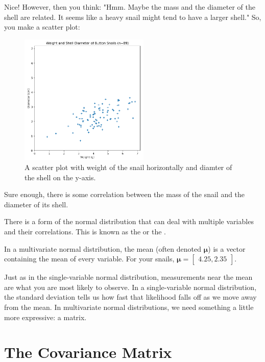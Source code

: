 Nice! However, then you think: "Hmm. Maybe the mass and the diameter of the shell are related. It seems like a heavy snail might tend to have a larger shell."  So, you make a scatter plot:

\begin{figure}[htbp]
    \centering
    \includegraphics[width=0.55\textwidth]{scatter.png}
    \caption{A scatter plot with weight of the snail horizontally and diamter of the shell on the y-axis.}
    \label{fig:example}
\end{figure}

Sure enough, there is some correlation between the mass of the snail and the diameter of its shell.

There is a form of the normal distribution that can deal with multiple variables and their correlations.
This is known as the  or the .  

In a multivariate normal distribution, the mean (often denoted $\boldsymbol\mu$) is a vector containing the mean of every variable.
For your snails, $\boldsymbol\mu = \begin{bmatrix} 4.25, 2.35 \end{bmatrix}$.

Just as in the single-variable normal distribution, measurements near the mean are what you are most likely to observe.
In a single-variable normal distribution, the standard deviation tells us how fast that likelihood falls off as we move away from the mean.
In multivariate normal distributions, we need something a little more expressive: a matrix.

\section{The Covariance Matrix}

